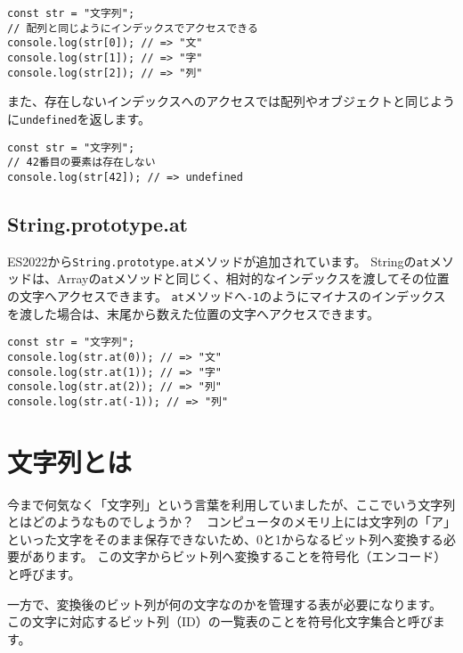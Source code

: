 \begin{lstlisting}
const str = "文字列";
// 配列と同じようにインデックスでアクセスできる
console.log(str[0]); // => "文"
console.log(str[1]); // => "字"
console.log(str[2]); // => "列"
\end{lstlisting}

また、存在しないインデックスへのアクセスでは配列やオブジェクトと同じように\texttt{undefined}を返します。

\begin{lstlisting}
const str = "文字列";
// 42番目の要素は存在しない
console.log(str[42]); // => undefined
\end{lstlisting}

\hypertarget{string-at}{%
\subsection[\texttt{String.prototype.at}]{String.prototype.at\,\protect{}}\label{string-at}}

ES2022から\texttt{String.prototype.at}メソッドが追加されています。
Stringの\texttt{at}メソッドは、Arrayの\texttt{at}メソッドと同じく、相対的なインデックスを渡してその位置の文字へアクセスできます。
\texttt{at}メソッドへ\texttt{-1}のようにマイナスのインデックスを渡した場合は、末尾から数えた位置の文字へアクセスできます。

\begin{lstlisting}
const str = "文字列";
console.log(str.at(0)); // => "文"
console.log(str.at(1)); // => "字"
console.log(str.at(2)); // => "列"
console.log(str.at(-1)); // => "列"
\end{lstlisting}

\hypertarget{what-is-string}{%
\section{文字列とは}\label{what-is-string}}

今まで何気なく「文字列」という言葉を利用していましたが、ここでいう文字列とはどのようなものでしょうか？　コンピュータのメモリ上には文字列の「ア」といった文字をそのまま保存できないため、0と1からなるビット列へ変換する必要があります。
この文字からビット列へ変換することを符号化（エンコード）と呼びます。

\enlargethispage{\baselineskip}一方で、変換後のビット列が何の文字なのかを管理する表が必要になります。
この文字に対応するビット列（ID）の一覧表のことを符号化文字集合と呼びます。

